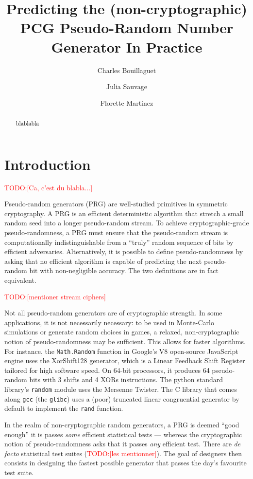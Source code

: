 \documentclass[submission,svgnames,journal=tosc]{iacrtrans}
\title[Predicting the PCG Pseudo-Random Number Generator in Practice]{Predicting the (non-cryptographic) PCG Pseudo-Random Number Generator In Practice}
\author{Charles Bouillaguet\inst{1} \and Julia Sauvage\inst{2} \and Florette Martinez\inst{3}}
\institute{%
University of Lille, France \\ 
\email{charles.bouillaguet@univ-lille.fr}
\and 
Sorbonne University \\
\email{julia.sauvage@etu.upmc.fr}
\and 
LIP6, CNRS, SU ? \\
\email{florette.martinez@lip6.fr}

}
\newcommand{\todo}[1]{\textcolor{red}{TODO:[#1]}}
\begin{document}
\maketitle


\begin{abstract}
  blablabla
\end{abstract}

\section{Introduction} %

\todo{Ca, c'est du blabla...}

Pseudo-random generators (PRG) are well-studied primitives in symmetric
cryptography. A PRG is an efficient deterministic algorithm that stretch a small
random seed into a longer pseudo-random stream. To achieve cryptographic-grade
pseudo-randomness, a PRG must ensure that the pseudo-random stream is
computationally indistinguishable from a ``truly'' random sequence of bits by
efficient adversaries. Alternatively, it is possible to define pseudo-randomness
by asking that no efficient algorithm is capable of predicting the next
pseudo-random bit with non-negligible accuracy. The two definitions are in fact
equivalent.

\todo{mentioner stream ciphers}

Not all pseudo-random generators are of cryptographic strength. In some
applications, it is not necessarily necessary: to be used in Monte-Carlo
simulations or generate random choices in games, a relaxed, non-cryptographic
notion of pseudo-randomness may be sufficient. This allows for faster
algorithms. For instance, the \texttt{Math.Random} function in Google's V8
open-source JavaScript engine uses the \textsf{XorShift128} generator, which is
a Linear Feedback Shift Register tailored for high software speed. On 64-bit
processors, it produces 64 pseudo-random bits with 3 shifts and 4 XORs
instructions. The \textsf{python} standard library's \texttt{random} module uses
the Mersenne Twister. The \textsf{C} library that comes along \texttt{gcc} (the
\texttt{glibc}) uses a (poor) truncated linear congruential generator by default
to implement the \texttt{rand} function.

In the realm of non-cryptographic random generators, a PRG is deemed ``good
enough'' it is passes \emph{some} efficient statistical tests --- whereas the
cryptographic notion of pseudo-randomness asks that it passes \emph{any}
efficient test. There are \textit{de facto} statistical test suites (\todo{les
  mentionner}). The goal of designers then consists in designing the fastest
possible generator that passes the day's favourite test suite.
\end{document}

